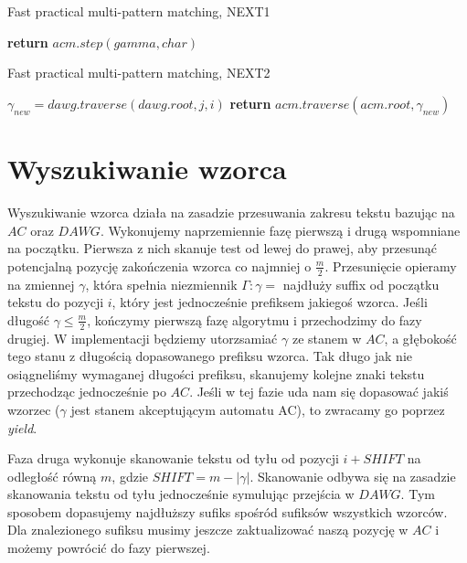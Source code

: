 \documentclass[a4paper,11pt]{article}
\begin{document}
\begin{algorithm}
\caption{Fast practical multi-pattern matching, NEXT1}
\begin{algorithmic}[1]
\State \textbf{return} $ acm.step(gamma, char)$ 
\EndProcedure
\end{algorithmic}
\end{algorithm}

\begin{algorithm}
\caption{Fast practical multi-pattern matching, NEXT2}
\begin{algorithmic}[1]
 
\State $\gamma_{new} = dawg.traverse(dawg.root, j, i)$ 
\State \textbf{return} $ acm.traverse(acm.root, \gamma_{new})$ 
\EndProcedure
\end{algorithmic}
\end{algorithm}

\section{Wyszukiwanie wzorca}

Wyszukiwanie wzorca działa na zasadzie przesuwania zakresu tekstu bazując na $AC$ oraz $DAWG$. Wykonujemy naprzemiennie fazę pierwszą i drugą wspomniane na początku. Pierwsza z nich skanuje test od lewej do prawej, aby przesunąć potencjalną pozycję zakończenia wzorca co najmniej o $\frac{m}{2}$. Przesunięcie opieramy na zmiennej $\gamma$, która spełnia niezmiennik $\Gamma: \gamma = $ najdłuży suffix od początku tekstu do pozycji $i$, który jest jednocześnie prefiksem jakiegoś wzorca. Jeśli długość $\gamma \leq \frac{m}{2}$, kończymy pierwszą fazę algorytmu i przechodzimy do fazy drugiej. W implementacji będziemy utorzsamiać $\gamma$ ze stanem w $AC$, a głębokość tego stanu z długością dopasowanego prefiksu wzorca. Tak długo jak nie osiągneliśmy wymaganej długości prefiksu, skanujemy kolejne znaki tekstu przechodząc jednocześnie po $AC$. Jeśli w tej fazie uda nam się dopasować jakiś wzorzec ($\gamma$ jest stanem akceptującym automatu AC), to zwracamy go poprzez \textit{yield}.

Faza druga wykonuje skanowanie tekstu od tyłu od pozycji $i + SHIFT$ na odległość równą $m$, gdzie $SHIFT = m - |\gamma|$. Skanowanie odbywa się na zasadzie skanowania tekstu od tyłu jednocześnie symulując przejścia w $DAWG$. Tym sposobem dopasujemy najdłuższy sufiks spośród sufiksów wszystkich wzorców. Dla znalezionego sufiksu musimy jeszcze zaktualizować naszą pozycję w $AC$ i możemy powrócić do fazy pierwszej. 
\end{document}

